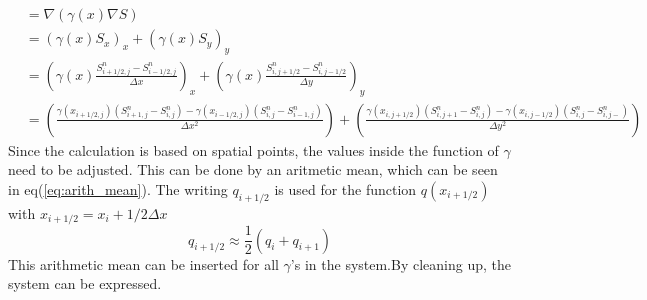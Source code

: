 \documentclass[%
twoside,                 %
final,                   %
10pt]{article}
\begin{document}
\begin{equation} \label{eq:gamma}
    \begin{aligned}
    &=\nabla(\gamma(x) \nabla S) \\
    &=(\gamma(x) S_x)_x+(\gamma(x) S_y)_y \\
    &= \left(\gamma(x) \frac{S^{n}_{i+1/2,j}-S^{n}_{i-1/2,j}}{\Delta x}\right)_x+\left(\gamma(x) \frac{S^{n}_{i,j+1/2}-S^{n}_{i,j-1/2}}{\Delta y}\right)_y \\
    &= \left(\frac{\gamma(x_{i+1/2,j})(S^{n}_{i+1,j}-S^{n}_{i,j})-\gamma(x_{i-1/2,j})(S^{n}_{i,j}-S^{n}_{i-1,j})}{\Delta x^2}\right)+\left(\frac{\gamma(x_{i,j+1/2})(S^{n}_{i,j+1}-S^{n}_{i,j})-\gamma(x_{i,j-1/2})(S^{n}_{i,j}-S^{n}_{i,j-})}{\Delta y^2}\right)
    \end{aligned}
\end{equation}
Since the calculation is based on spatial points, the values inside the function of $\gamma$ need to be adjusted. This can be done by an aritmetic mean, which can be seen in eq(\ref{eq:arith_mean}). The writing $q_{i+1/2}$ is used for the function $q(x_{i+1/2})$ with $x_{i+1/2} = x_i + 1/2 \Delta x$
\begin{equation} \label{eq:arith_mean}
q_{i+1/2} \approx \frac{1}{2}(q_i +q_{i+1})
\end{equation}
This arithmetic mean can be inserted for all $\gamma$'s in the system.By cleaning up, the system can be expressed.
\end{document}
